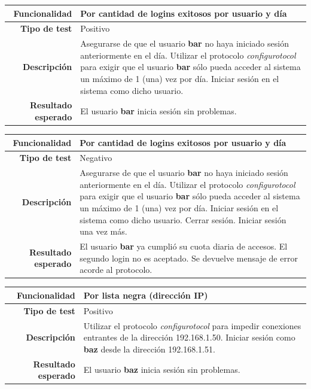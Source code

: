 \documentclass[a4paper,10pt]{article}
\begin{document}
\begin{center}
  \begin{tabular}{|r|p{12.5cm}|}
    \hline
    \textbf{Funcionalidad}	&	Por cantidad de logins exitosos por usuario y día\\
    \hline
    \textbf{Tipo de test}	&	Positivo\\
    \hline
    \textbf{Descripción}	&	Asegurarse de que el usuario \textbf{bar} no haya iniciado sesión
					anteriormente en el día.
					Utilizar el protocolo \textit{configurotocol} para exigir que el usuario
					\textbf{bar} sólo pueda acceder al sistema un máximo de 1 (una) vez
					por día. Iniciar sesión en el sistema como dicho usuario.\\
    \hline
    \textbf{Resultado esperado}	&	El usuario \textbf{bar} inicia sesión sin problemas.\\
    \hline   
  \end{tabular}
\end{center}

\begin{center}
  \begin{tabular}{|r|p{12.5cm}|}
    \hline
    \textbf{Funcionalidad}	&	Por cantidad de logins exitosos por usuario y día\\
    \hline
    \textbf{Tipo de test}	&	Negativo\\
    \hline
    \textbf{Descripción}	&	Asegurarse de que el usuario \textbf{bar} no haya iniciado sesión
					anteriormente en el día.
					Utilizar el protocolo \textit{configurotocol} para exigir que el usuario
					\textbf{bar} sólo pueda acceder al sistema un máximo de 1 (una) vez
					por día. Iniciar sesión en el sistema como dicho usuario. Cerrar sesión.
					Iniciar sesión una vez más.\\
    \hline
    \textbf{Resultado esperado}	&	El usuario \textbf{bar} ya cumplió su cuota diaria de accesos.
					El segundo login no es aceptado. Se devuelve mensaje de error acorde al protocolo.\\
    \hline   
  \end{tabular}
\end{center}

\begin{center}
  \begin{tabular}{|r|p{12.5cm}|}
    \hline
    \textbf{Funcionalidad}	&	Por lista negra (dirección IP)\\
    \hline
    \textbf{Tipo de test}	&	Positivo\\
    \hline
    \textbf{Descripción}	&	Utilizar el protocolo \textit{configurotocol} para impedir conexiones
					entrantes de la dirección 192.168.1.50. Iniciar sesión como
					\textbf{baz} desde la dirección 192.168.1.51.\\
    \hline
    \textbf{Resultado esperado}	&	El usuario \textbf{baz} inicia sesión sin problemas.\\
    \hline   
  \end{tabular}
\end{center}
\end{document}
